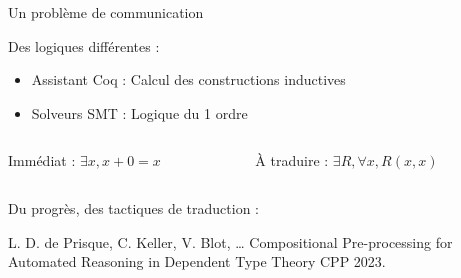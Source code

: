 \documentclass[french,usepdftitle=false,compress]{beamer}
\begin{document}
\begin{frame}{Un problème de communication}
  \begin{alertblock}{Des logiques différentes :}
    \begin{itemize}
      \item Assistant Coq : Calcul des constructions inductives
      \item Solveurs SMT : Logique du 1\ier{} ordre
    \end{itemize}
  \end{alertblock}

  {
    \begin{columns}
      \begin{column}{0.3\textwidth}
        \begin{block}{\centering Immédiat :}
          \centering
          $\exists x, x + 0 = x$
        \end{block}
      \end{column}

      \begin{column}{0.3\textwidth}
        \begin{block}{\centering À traduire :}
          \centering
          $\exists R, \forall x, R(x,x)$
        \end{block}
      \end{column}
    \end{columns}
  }
  {
    \begin{exampleblock}{Du progrès, des tactiques de traduction :}
      \begin{thebibliography}{10}
        \beamertemplatearticlebibitems
        L. D. de Prisque, C. Keller, V. Blot, \dots
        \newblock Compositional Pre-processing for Automated Reasoning in Dependent Type Theory
        \newblock CPP 2023.
      \end{thebibliography}
    \end{exampleblock}
  }
\end{frame}
\end{document}
